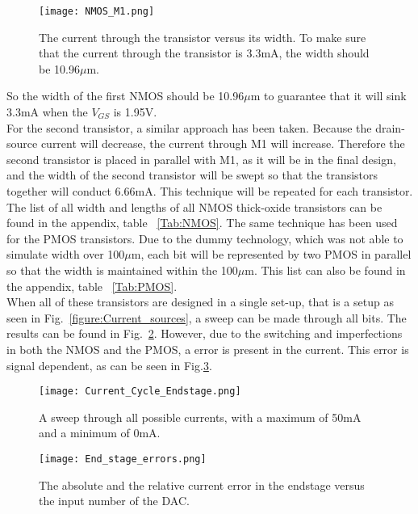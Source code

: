 \begin{figure}[h]
\begin{center}
\texttt{[image: NMOS\_M1.png]}
\caption{The current through the transistor versus its width. To make sure that the current through the transistor is 3.3mA, the width should be 10.96$\mu$m.}
\label{fig:NMOS_Width_Sweep_Result}
\end{center}
\end{figure}
So the width of the first NMOS should be 10.96$\mu$m to guarantee that it will sink 3.3mA when the $V_{GS}$ is 1.95V.\\
For the second transistor, a similar approach has been taken. Because the drain-source current will decrease, the current through M1 will increase. Therefore the second transistor is placed in parallel with M1, as it will be in the final design, and the width of the second transistor will be swept so that the transistors together will conduct 6.66mA. This technique will be repeated for each transistor. The list of all width and lengths of all NMOS thick-oxide transistors can be found in the appendix, table ~\ref{Tab:NMOS}.
The same technique has been used for the PMOS transistors. Due to the dummy technology, which was not able to simulate width over 100$\mu$m, each bit will be represented by two PMOS in parallel so that the width is maintained within the 100$\mu$m. This list can also be found in the appendix, table ~\ref{Tab:PMOS}.\\

When all of these transistors are designed in a single set-up, that is a setup as seen in Fig.~\ref{figure:Current_sources}, a sweep can be made through all bits. The results can be found in Fig.~\ref{fig:Final_result}. However, due to the switching and imperfections in both the NMOS and the PMOS, a error is present in the current. This error is signal dependent, as can be seen in Fig.\ref{fig:Current_error}.
\begin{figure}[h]
\begin{center}
\texttt{[image: Current\_Cycle\_Endstage.png]}
\caption{A sweep through all possible currents, with a maximum of 50mA and a minimum of 0mA.}
\label{fig:Final_result}
\end{center}
\end{figure}
\begin{figure}[h]
\begin{center}
\texttt{[image: End\_stage\_errors.png]}
\caption{The absolute and the relative current error in the endstage versus the input number of the DAC.}
\label{fig:Current_error}
\end{center}
\end{figure}

